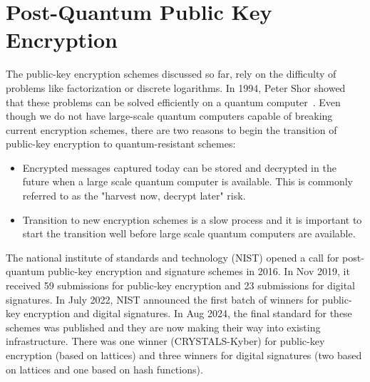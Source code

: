 
\section{Post-Quantum Public Key Encryption}
The public-key encryption schemes discussed so far, rely on the difficulty of problems like factorization or discrete logarithms. In 1994, Peter Shor showed that these problems can be solved efficiently on a quantum computer~\cite{FOCS:Shor94}. Even though we do not have large-scale quantum computers capable of breaking current encryption schemes, there are two reasons to begin the transition of public-key encryption to quantum-resistant schemes:
\begin{itemize}
    \item Encrypted messages captured today can be stored and decrypted in the future when a large scale quantum computer is available. This is commonly referred to as the "harvest now, decrypt later" risk.
    \item Transition to new encryption schemes is a slow process and it is important to start the transition well before large scale quantum computers are available.
\end{itemize}

The national institute of standards and technology (NIST) opened a call for post-quantum public-key encryption and signature schemes in 2016. In Nov 2019, it received 59 submissions for public-key encryption and 23 submissions for digital signatures. In July 2022, NIST announced the first batch of winners for public-key encryption and digital signatures. In Aug 2024, the final standard for these schemes was published and they are now making their way into existing infrastructure. There was one winner (CRYSTALS-Kyber) for public-key encryption (based on lattices) and three winners for digital signatures (two based on lattices and one based on hash functions).

